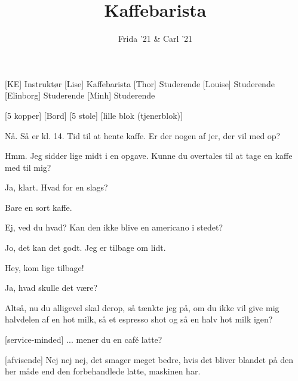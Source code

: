 \documentclass[a4paper,11pt]{article}
\title{Kaffebarista}
\author{Frida '21 \& Carl '21}
\begin{document}
\maketitle

\begin{roles}
[KE] Instruktør
[Lise] Kaffebarista
[Thor] Studerende
[Louise] Studerende
[Elinborg] Studerende
[Minh] Studerende
\end{roles}

\begin{props}
[5 kopper]
[Bord]
[5 stole]
[lille blok (tjenerblok)]
\end{props}


\begin{sketch}

 Nå. Så er kl. 14. Tid til at hente kaffe. Er der nogen af jer, der vil med op?

 Hmm. Jeg sidder lige midt i en opgave. Kunne du overtales til at tage en kaffe med til mig?

 Ja, klart. Hvad for en slags?

 Bare en sort kaffe.


 Ej, ved du hvad? Kan den ikke blive en americano i stedet?


 Jo, det kan det godt. Jeg er tilbage om lidt.

 Hey, kom lige tilbage!


 Ja, hvad skulle det være?



 Altså, nu du alligevel skal derop, så tænkte jeg på, om du ikke vil give mig halvdelen af en hot milk, så et espresso shot og så en halv hot milk igen?

[service-minded] ... mener du en café latte?

[afvisende] Nej nej nej, det smager meget bedre, hvis det bliver blandet på den her måde end den forbehandlede latte, maskinen har.


\end{sketch}
\end{document}
